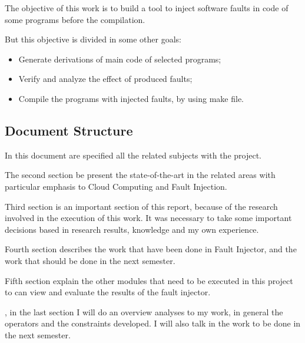 The  objective of this work is to build a tool to inject software faults in code of some programs before the compilation.

But this objective is divided in some other goals:

\begin{itemize}
	\item Generate derivations of main code of selected programs;
	\item Verify and analyze the effect of produced faults;
	\item Compile the programs with injected faults, by using make file.
\end{itemize}


\subsection{Document Structure}

In this document are specified all the related subjects with the project.

The second section be present the state-of-the-art in the related areas with particular emphasis to Cloud Computing and Fault Injection.

Third section is an important section of this report, because of the research involved in the execution of this work. It was necessary to take some important decisions based in research results, knowledge and my own experience.

Fourth section describes the work that have been done in Fault Injector, and the work that should be done in the next semester.

Fifth section explain the other modules that need to be executed in this project to can view and evaluate the results of the fault injector.

, in the last section I will do an overview analyses to my work, in general the operators and the constraints developed. I will also talk in the work to be done in the next semester.

